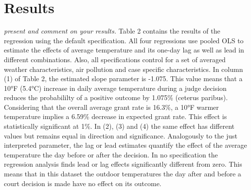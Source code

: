 \documentclass[11pt]{article}
\begin{document}
	\section{Results}
	\textit{present and comment on your results.} \newline
	Table 2 contains the results of the regression using the default specification. All four regressions use pooled OLS to estimate the effects of average temperature and its one-day lag as well as lead in different combinations. Also, all specifications control for a set of averaged weather characteristics, air pollution and case specific characteristics.
	In column (1) of Table 2, the estimated slope parameter is -1.075. This value means that a 10°F (5.4°C) increase in daily average temperature during a judge decision reduces the probabililty of a positive outcome by 1.075\% (ceterus paribus). Considering that the overall average grant rate is 16.3\%, a 10°F warmer temperature implies a 6.59\% decrease in expected grant rate. This effect is statistically significant at 1\%. In (2), (3) and (4) the same effect has different values but remains equal in direction and significance. Analogously to the just interpreted parameter, the lag or lead estimates quantify the effect of the average temperature the day before or after the decision. In no specification the regression analysis finds lead or lag effects significantly different from zero. This means that in this dataset the outdoor temperatures the day after and before a court decision is made have no effect on its outcome. 	
	
\end{document}
